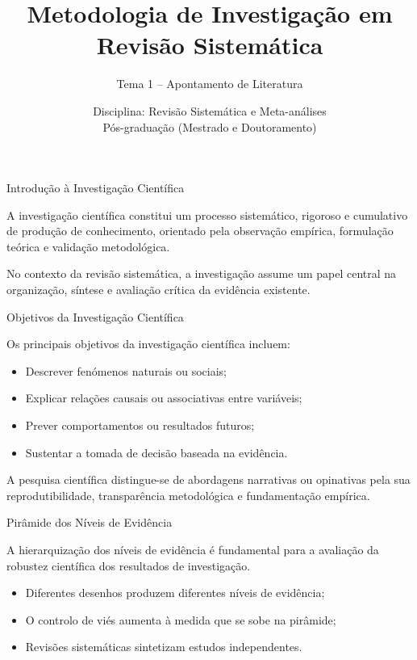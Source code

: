 \documentclass[aspectratio=169]{beamer}
\title[Revisão Sistemática]{
Metodologia de Investigação em Revisão Sistemática
}
\subtitle{
Tema 1 – Apontamento de Literatura
}
\author{
Disciplina: Revisão Sistemática e Meta-análises\\
Pós-graduação (Mestrado e Doutoramento)
}
\date{}
\begin{document}
\begin{frame}
\titlepage
\end{frame}

\begin{frame}{Introdução à Investigação Científica}

A investigação científica constitui um processo sistemático, rigoroso e cumulativo de produção de conhecimento, orientado pela observação empírica, formulação teórica e validação metodológica.

\vspace{0.3cm}

No contexto da revisão sistemática, a investigação assume um papel central na organização, síntese e avaliação crítica da evidência existente.

\end{frame}

\begin{frame}{Objetivos da Investigação Científica}

Os principais objetivos da investigação científica incluem:

\begin{itemize}
    \item Descrever fenómenos naturais ou sociais;
    \item Explicar relações causais ou associativas entre variáveis;
    \item Prever comportamentos ou resultados futuros;
    \item Sustentar a tomada de decisão baseada na evidência.
\end{itemize}

\vspace{0.3cm}

A pesquisa científica distingue-se de abordagens narrativas ou opinativas pela sua reprodutibilidade, transparência metodológica e fundamentação empírica.

\end{frame}

\begin{frame}{Pirâmide dos Níveis de Evidência}

A hierarquização dos níveis de evidência é fundamental para a avaliação da robustez científica dos resultados de investigação.

\begin{itemize}
    \item Diferentes desenhos produzem diferentes níveis de evidência;
    \item O controlo de viés aumenta à medida que se sobe na pirâmide;
    \item Revisões sistemáticas sintetizam estudos independentes.
\end{itemize}

\end{frame}
\end{document}
